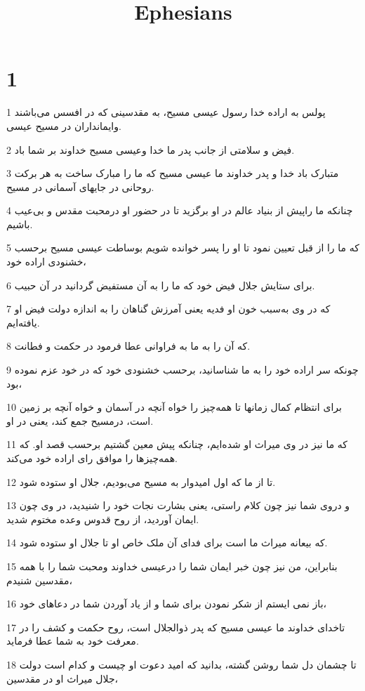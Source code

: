 

\title{Ephesians}


\chapter{1}

\par 1 پولس به اراده خدا رسول عیسی مسیح، به مقدسینی که در افسس می‌باشند وایمانداران در مسیح عیسی.
\par 2 فیض و سلامتی از جانب پدر ما خدا وعیسی مسیح خداوند بر شما باد.
\par 3 متبارک باد خدا و پدر خداوند ما عیسی مسیح که ما را مبارک ساخت به هر برکت روحانی در جایهای آسمانی در مسیح.
\par 4 چنانکه ما راپیش از بنیاد عالم در او برگزید تا در حضور او درمحبت مقدس و بی‌عیب باشیم.
\par 5 که ما را از قبل تعیین نمود تا او را پسر خوانده شویم بوساطت عیسی مسیح برحسب خشنودی اراده خود،
\par 6 برای ستایش جلال فیض خود که ما را به آن مستفیض گردانید در آن حبیب.
\par 7 که در وی به‌سبب خون او فدیه یعنی آمرزش گناهان را به اندازه دولت فیض او یافته‌ایم.
\par 8 که آن را به ما به فراوانی عطا فرمود در حکمت و فطانت.
\par 9 چونکه سر اراده خود را به ما شناسانید، برحسب خشنودی خود که در خود عزم نموده بود،
\par 10 برای انتظام کمال زمانها تا همه‌چیز را خواه آنچه در آسمان و خواه آنچه بر زمین است، درمسیح جمع کند، یعنی در او.
\par 11 که ما نیز در وی میراث او شده‌ایم، چنانکه پیش معین گشتیم برحسب قصد او. که همه‌چیزها را موافق رای اراده خود می‌کند.
\par 12 تا از ما که اول امیدوار به مسیح می‌بودیم، جلال او ستوده شود.
\par 13 و دروی شما نیز چون کلام راستی، یعنی بشارت نجات خود را شنیدید، در وی چون ایمان آوردید، از روح قدوس وعده مختوم شدید.
\par 14 که بیعانه میراث ما است برای فدای آن ملک خاص او تا جلال او ستوده شود.
\par 15 بنابراین، من نیز چون خبر ایمان شما را درعیسی خداوند ومحبت شما را با همه مقدسین شنیدم،
\par 16 باز نمی ایستم از شکر نمودن برای شما و از یاد آوردن شما در دعاهای خود،
\par 17 تاخدای خداوند ما عیسی مسیح که پدر ذوالجلال است، روح حکمت و کشف را در معرفت خود به شما عطا فرماید.
\par 18 تا چشمان دل شما روشن گشته، بدانید که امید دعوت او چیست و کدام است دولت جلال میراث او در مقدسین،
